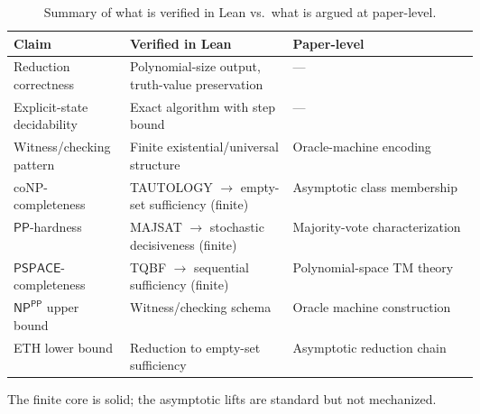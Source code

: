 \begin{table}[h]
\centering
\small
\setlength{\tabcolsep}{4pt}
\renewcommand{\arraystretch}{1.12}
\begin{tabularx}{\linewidth}{@{}>{\raggedright\arraybackslash}m{0.25\linewidth}>{\raggedright\arraybackslash}m{0.35\linewidth}>{\raggedright\arraybackslash}X@{}}
\toprule
\textbf{Claim} & \textbf{Verified in Lean} & \textbf{Paper-level} \\
\midrule
Reduction correctness & Polynomial-size output, truth-value preservation & --- \\
\midrule
Explicit-state decidability & Exact algorithm with step bound & --- \\
\midrule
Witness/checking pattern & Finite existential/universal structure & Oracle-machine encoding \\
\midrule
coNP-completeness & TAUTOLOGY $\to$ empty-set sufficiency (finite) & Asymptotic class membership \\
\midrule
$\mathsf{PP}$-hardness & MAJSAT $\to$ stochastic decisiveness (finite) & Majority-vote characterization \\
\midrule
$\mathsf{PSPACE}$-completeness & TQBF $\to$ sequential sufficiency (finite) & Polynomial-space TM theory \\
\midrule
$\mathsf{NP}^{\mathsf{PP}}$ upper bound & Witness/checking schema & Oracle machine construction \\
\midrule
ETH lower bound & Reduction to empty-set sufficiency & Asymptotic reduction chain \\
\bottomrule
\end{tabularx}
\caption{Summary of what is verified in Lean vs.\ what is argued at paper-level.}
\label{tab:artifact-scope}
\end{table}

The finite core is solid; the asymptotic lifts are standard but not mechanized.

